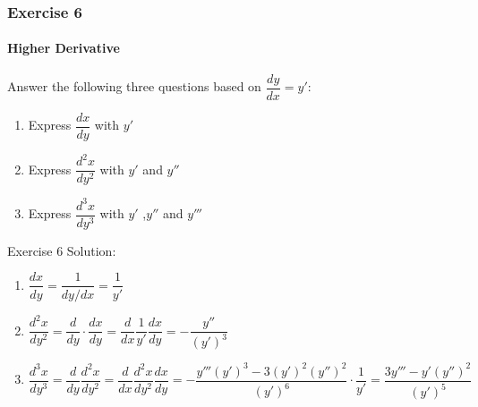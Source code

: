 \documentclass{beamer}
\begin{document}
\begin{frame}
		\frametitle{Exercise 6}
		\framesubtitle{Higher Derivative}
		 Answer the following three questions based on $\dfrac{dy}{dx} = y'$:
		\begin{enumerate}
			\item Express $\dfrac{dx}{dy}$ with $y'$
			\item Express $\dfrac{d^{2}x}{dy^{2}}$ with $y'$ and $y''$
			\item Express $\dfrac{d^{3}x}{dy^{3}}$ with $y'$ ,$y''$ and $y'''$
		\end{enumerate}
	\end{frame}
	
\begin{frame}{Exercise 6}
Solution:
\begin{enumerate}
    \item $\dfrac{dx}{dy} = \dfrac{1}{dy/dx} = \dfrac{1}{y'}$
    \item $\dfrac{d^2x}{dy^2} = \dfrac{d}{dy}\cdot \dfrac{dx}{dy} = \dfrac{d}{dx}\dfrac{1}{y'}\dfrac{dx}{dy} = -\dfrac{y''}{(y')^3}$
    \item $\dfrac{d^3x}{dy^3} = \dfrac{d}{dy}\dfrac{d^2x}{dy^2} = \dfrac{d}{dx}\dfrac{d^2x}{dy^2}\dfrac{dx}{dy} = - \dfrac{y'''(y')^3 - 3(y')^2(y'')^2}{(y')^6}\cdot \dfrac{1}{y'} = \dfrac{3y''' - y' (y'')^2}{(y')^5}$
\end{enumerate}
    
\end{frame}
\end{document}
